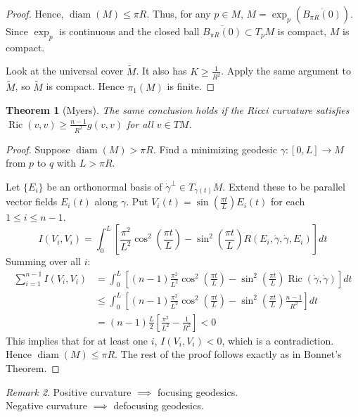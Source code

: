 \documentclass[11pt, a4paper]{article}
\theoremstyle{plain}
\newtheorem{theorem}{Theorem}[section]
\theoremstyle{definition}
\theoremstyle{remark}
\newtheorem{remark}[theorem]{Remark}
\DeclareMathOperator{\diam}{diam}
\DeclareMathOperator{\Ric}{Ric}
\begin{document}
{\begin{proof}
Hence, $\diam(M) \le \pi R$. Thus, for any $p \in M$, $M = \exp_p\left(\overline{B_{\pi R}(0)}\right)$. Since $\exp_p$ is continuous and the closed ball $\overline{B_{\pi R}(0)} \subset T_p M$ is compact, $M$ is compact.

Look at the universal cover $\tilde{M}$. It also has $K \ge \frac{1}{R^2}$. Apply the same argument to $\tilde{M}$, so $\tilde{M}$ is compact. Hence $\pi_1(M)$ is finite.
\end{proof}

\begin{theorem}[Myers]
The same conclusion holds if the Ricci curvature satisfies $\Ric(v,v) \ge \frac{n-1}{R^2} g(v,v)$ for all $v \in TM$.
\end{theorem}

\begin{proof}
Suppose $\diam(M) > \pi R$. Find a minimizing geodesic $\gamma: [0, L] \to M$ from $p$ to $q$ with $L > \pi R$.

Let $\{E_i\}$ be an orthonormal basis of $\dot{\gamma}^\perp \in T_{\gamma(t)}M$. Extend these to be parallel vector fields $E_i(t)$ along $\gamma$. 
Put $V_i(t) = \sin\left(\frac{\pi t}{L}\right) E_i(t)$ for each $1 \le i \le n-1$.
\[
I(V_i, V_i) = \int_0^L \left[ \frac{\pi^2}{L^2} \cos^2\left(\frac{\pi t}{L}\right) - \sin^2\left(\frac{\pi t}{L}\right) R(E_i, \dot{\gamma}, \dot{\gamma}, E_i) \right] dt
\]
Summing over all $i$:
\begin{align*}
\sum_{i=1}^{n-1} I(V_i, V_i) &= \int_0^L \left[ (n-1)\frac{\pi^2}{L^2} \cos^2\left(\frac{\pi t}{L}\right) - \sin^2\left(\frac{\pi t}{L}\right) \Ric(\dot{\gamma}, \dot{\gamma}) \right] dt \\
&\le \int_0^L \left[ (n-1)\frac{\pi^2}{L^2} \cos^2\left(\frac{\pi t}{L}\right) - \sin^2\left(\frac{\pi t}{L}\right) \frac{n-1}{R^2} \right] dt \\
&= (n-1) \frac{L}{2} \left[ \frac{\pi^2}{L^2} - \frac{1}{R^2} \right] < 0
\end{align*}
This implies that for at least one $i$, $I(V_i, V_i) < 0$, which is a contradiction. Hence $\diam(M) \le \pi R$. The rest of the proof follows exactly as in Bonnet's Theorem.
\end{proof}

\begin{remark}
Positive curvature $\implies$ focusing geodesics. \\
Negative curvature $\implies$ defocusing geodesics.
\end{remark}

}
\end{document}
